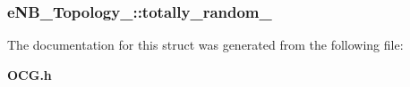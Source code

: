 \subsubsection[{totally\_\-random\_\-}]{ {\bf eNB\_\-Topology\_\-::totally\_\-random\_\-}}\label{structeNB__Topology___fb5b010986841e89b87506faf3733365}




The documentation for this struct was generated from the following file:\begin{CompactItemize}
\item 
{\bf OCG.h}\end{CompactItemize}
